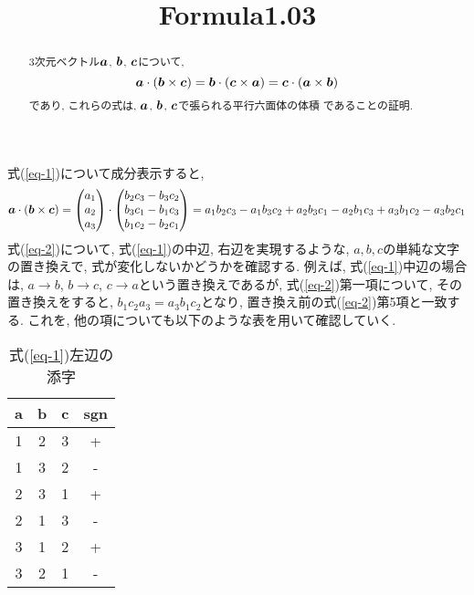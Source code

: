 \documentclass{jsarticle}
\title{Formula1.03}
\newcommand*{\mbold}[1]{\mbox{\boldmath $#1$}}
\begin{document}
\maketitle
\begin{abstract}
  3次元ベクトル$\mbold{a}$, $\mbold{b}$, $\mbold{c}$について, 
  \begin{equation}\label{eq-1}
    \mbold{a} \cdot (\mbold{b} \times \mbold{c}) 
    = \mbold{b} \cdot (\mbold{c} \times \mbold{a}) 
    = \mbold{c} \cdot (\mbold{a} \times \mbold{b})
  \end{equation}
  であり, 
  これらの式は, $\mbold{a}$, $\mbold{b}$, $\mbold{c}$で張られる平行六面体の体積
  であることの証明. 
\end{abstract}


式(\ref{eq-1})について成分表示すると, 
\begin{equation}\label{eq-2}
  \mbold{a} \cdot (\mbold{b} \times \mbold{c}) = 
  \begin{pmatrix}
        a_1 \\
        a_2 \\
        a_3
  \end{pmatrix}
  \cdot
  \begin{pmatrix}
    b_2 c_3 - b_3 c_2 \\
    b_3 c_1 - b_1 c_3 \\
    b_1 c_2 - b_2 c_1
  \end{pmatrix}
  = a_1 b_2 c_3 - a_1 b_3 c_2 + a_2 b_3 c_1 - a_2 b_1 c_3 + a_3 b_1 c_2 - a_3 b_2 c_1
\end{equation}
式(\ref{eq-2})について, 式(\ref{eq-1})の中辺, 右辺を実現するような, $a, b, c$の単純な文字の置き換えで, 式が変化しないかどうかを確認する. 
例えば, 式(\ref{eq-1})中辺の場合は, $a \rightarrow b$, $b \rightarrow c$, $c \rightarrow a$という置き換えであるが, 式(\ref{eq-2})第一項について, その置き換えをすると, $b_1 c_2 a_3 = a_3 b_1 c_2$となり, 置き換え前の式(\ref{eq-2})第5項と一致する. これを, 他の項についても以下のような表を用いて確認していく. 
\begin{table}[hbtp]
  \caption{式(\ref{eq-1})左辺の添字}
  \centering
  \begin{tabular}{|c|c|c|c|}
    \hline
    a & b & c & sgn \\
    \hline \hline
    1 & 2 & 3 & + \\
    \hdashline
    \rowcolor{yellow}1 & 3 & 2 & - \\
    \hdashline
    \rowcolor{green}2 & 3 & 1 & + \\
    \hdashline
    \rowcolor{red}2 & 1 & 3 & - \\
    \hdashline
    \rowcolor{cyan}3 & 1 & 2 & + \\
    \hdashline
    \rowcolor{magenta}3 & 2 & 1 & - \\
    \hline
  \end{tabular}
\end{table}
\end{document}
